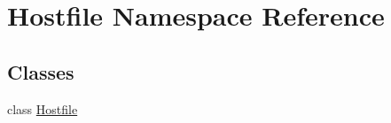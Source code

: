 \hypertarget{namespace_hostfile}{\section{Hostfile Namespace Reference}
\label{namespace_hostfile}
}
\subsection*{Classes}
\begin{DoxyCompactItemize}
\item 
class \hyperlink{class_hostfile_1_1_hostfile}{Hostfile}
\end{DoxyCompactItemize}
